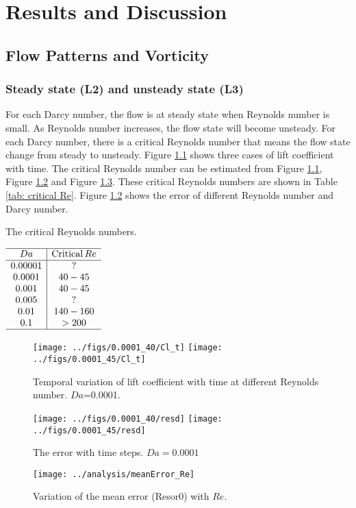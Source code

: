 \chapter{Results and Discussion}
\section{Flow Patterns and Vorticity}
\subsection{Steady state (L2) and unsteady state (L3)}
For each Darcy number, the flow is at steady state when Reynolds number is small. As Reynolds number increases, the flow state will become unsteady.
For each Darcy number, there is a critical Reynolds number that means the flow state change from steady to unsteady. Figure \ref{fig: Cl_t} shows three cases of lift coefficient with time. The critical Reynolds number can be estimated from Figure \ref{fig: Cl_t}, Figure \ref{fig: resd} and Figure \ref{fig: error}.  These critical Reynolds numbers are shown in Table \ref{tab: critical Re}.
Figure \ref{fig: resd} shows the error of different Reynolds number and Darcy number.
\begin{table}[]
	\centering
	\caption{The critical Reynolds numbers.}\label{tab: critical Re}
	$\begin{array}{c|c}
	\hline
	Da & \mathrm{Critical}\, Re \\ \hline
	0.00001& ?   \\
	0.0001 & 40-45 \\
	0.001  & 40-45 \\
	0.005  & ?   \\
	0.01   & 140-160 \\
	0.1    & >200\\
	\hline
	\end{array}$
\end{table}
\begin{figure}
	\centering
	{\texttt{[image: ../figs/0.0001\_40/Cl\_t]}}
	{\texttt{[image: ../figs/0.0001\_45/Cl\_t]}}
	\caption{Temporal variation of lift coefficient with time at different Reynolds number. $Da$=0.0001.}
	\label{fig: Cl_t}
\end{figure}
\begin{figure}
	\centering
	{\texttt{[image: ../figs/0.0001\_40/resd]}}
	{\texttt{[image: ../figs/0.0001\_45/resd]}}
	\caption{The error with time steps. $Da=0.0001$}
	\label{fig: resd}
\end{figure}
\begin{figure}
	\centering
	\texttt{[image: ../analysis/meanError\_Re]}
	\caption{Variation of the mean error (Resor0) with $Re$.}
	\label{fig: error}
\end{figure}

